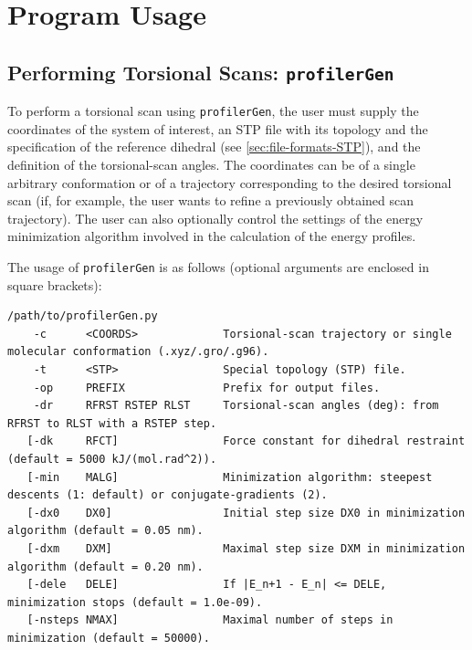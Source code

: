 \documentclass[10pt,a4paper,openany]{memoir}
\numberwithin{equation}{section}
\newcommand{\profilergen}[0]{\texttt{profilerGen}}
\begin{document}
\section{Program Usage}
\label{chap:program-usage}

\subsection{Performing Torsional Scans: \profilergen{}}
\label{sec:program-gen}

To perform a torsional scan using \profilergen{}, the user must supply
the coordinates of the system of interest, an STP file with its
topology and the specification of the reference dihedral (see
\autoref{sec:file-formats-STP}), and the definition of the
torsional-scan angles. The coordinates can be of a single arbitrary
conformation or of a trajectory corresponding to the desired torsional
scan (if, for example, the user wants to refine a previously obtained
scan trajectory). The user can also optionally control the settings of
the energy minimization algorithm involved in the calculation of the
energy profiles.

The usage of \profilergen{} is as follows (optional arguments are enclosed in square brackets):

\begin{lstlisting}
/path/to/profilerGen.py 
    -c      <COORDS>             Torsional-scan trajectory or single molecular conformation (.xyz/.gro/.g96).
    -t      <STP>                Special topology (STP) file.
    -op     PREFIX               Prefix for output files.
    -dr     RFRST RSTEP RLST     Torsional-scan angles (deg): from RFRST to RLST with a RSTEP step.
   [-dk     RFCT]                Force constant for dihedral restraint (default = 5000 kJ/(mol.rad^2)).
   [-min    MALG]                Minimization algorithm: steepest descents (1: default) or conjugate-gradients (2).
   [-dx0    DX0]                 Initial step size DX0 in minimization algorithm (default = 0.05 nm).
   [-dxm    DXM]                 Maximal step size DXM in minimization algorithm (default = 0.20 nm).
   [-dele   DELE]                If |E_n+1 - E_n| <= DELE, minimization stops (default = 1.0e-09).
   [-nsteps NMAX]                Maximal number of steps in minimization (default = 50000).
\end{lstlisting}\vspace{2ex} 
\end{document}

